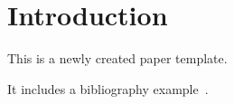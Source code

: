 \chapter{Introduction}

This is a newly created paper template.

It includes a bibliography example~\cite{lamport1994latex}.
